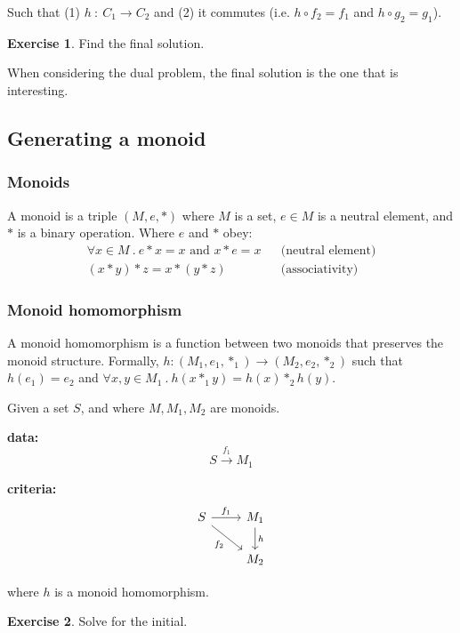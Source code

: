 \documentclass[a4paper, 12pt]{article}
\theoremstyle{definition}
\newtheorem{exercise}{Exercise}
\begin{document}
Such that (1) $h\ :\ C_1 \rightarrow C_2$ and (2) it commutes (i.e. $h \circ f_2 = f_1$
and $h \circ g_2 = g_1$).

\begin{exercise}
    Find the final solution.
\end{exercise}

When considering the dual problem, the final solution is the one that is
interesting.

\subsection{Generating a monoid}

\subsubsection*{Monoids}

A monoid is a triple $(M, e, \ast)$ where $M$ is a set, $e \in M$ is a neutral
element, and $\ast$ is a binary operation. Where $e$ and $\ast$ obey:
\begin{align*}
    \forall x \in M\ .\ e \ast x = x \text{ and } x \ast e = x && \text{(neutral
    element)} \\
    (x \ast y) \ast z = x \ast (y \ast z) && \text{(associativity)}
\end{align*}

\subsubsection*{Monoid homomorphism}
A monoid homomorphism is a function between two monoids that preserves the
monoid structure. Formally, $h : (M_1, e_1, \ast_1)
\rightarrow (M_2, e_2, \ast_2)$ such that $h(e_1) = e_2$ and $\forall x, y \in
M_1\ .\ h(x \ast_1 y) = h(x) \ast_2 h(y)$.

Given a set $S$, and where $M, M_1, M_2$ are monoids.

\textbf{data:}
$$S \overset{f_1}{\rightarrow}M_1$$

\textbf{criteria:}
$$
\begin{tikzcd}
    S \arrow[r, "f_1"] \arrow[dr, swap, "f_2"] & M_1 \arrow[d, "h"] \\
    {} & M_2
\end{tikzcd}
$$

where $h$ is a monoid homomorphism.

\begin{exercise}
    Solve for the initial.
\end{exercise}
\end{document}
